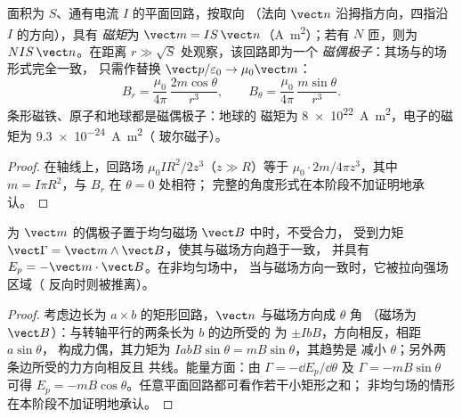 \begin{definition}[磁矩]\label{def:b1:magnetostatics:moment}
面积为 $S$、通有电流 $I$ 的平面回路，按取向
（法向 $\vect n$ 沿拇指方向，四指沿 $I$ 的方向），具有
\emph{磁矩}为 $\vect m = IS\,\vect n$（\unit{A.m^2}）；若有 $N$
匝，则为 $NIS\,\vect n$。在距离 $r \gg \sqrt S$ 处观察，该回路即为一个
\emph{磁偶极子}：其场与的场形式完全一致，
只需作替换 $\vect p/\varepsilon_0 \to \mu_0\vect m$：
\[
B_r = \frac{\mu_0}{4\pi}\,\frac{2m\cos\theta}{r^3}, \qquad
B_\theta = \frac{\mu_0}{4\pi}\,\frac{m\sin\theta}{r^3} .
\]
条形磁铁、原子和地球都是磁偶极子：地球的
磁矩为 \qty{8e22}{A.m^2}，电子的磁矩为 \qty{9.3e-24}{A.m^2}（
玻尔磁子）。
\end{definition}

\begin{proof}
在轴线上，回路场 $\mu_0IR^2/2z^3$（$z \gg R$）等于
$\mu_0 \cdot 2m/4\pi z^3$，其中 $m = I\pi R^2$，与 $B_r$ 在 $\theta = 0$ 处相符；
完整的角度形式在本阶段不加证明地承认。
\end{proof}

\begin{theorem}[场中的偶极子]\label{thm:b1:magnetostatics:dipoleinfield}
为 $\vect m$ 的偶极子置于均匀磁场 $\vect B$ 中时，不受合力，
受到力矩 $\vect\Gamma = \vect m\wedge\vect B$，使其与磁场方向趋于一致，
并具有 $E_p = -\vect m\cdot\vect B$。在非均匀场中，
当与磁场方向一致时，它被拉向强场区域（
反向时则被推离）。
\end{theorem}

\begin{proof}
考虑边长为 $a \times b$ 的矩形回路，$\vect n$ 与磁场方向成 $\theta$ 角
（磁场为 $\vect B$）：与转轴平行的两条长为 $b$ 的边所受的
为 $\pm IbB$，方向相反，相距 $a\sin\theta$，
构成力偶，其力矩为 $IabB\sin\theta = mB\sin\theta$，其趋势是
减小 $\theta$；另外两条边所受的力方向相反且
共线。能量方面：由 $\Gamma = -\dd E_p/\dd\theta$ 及 $\Gamma = -mB\sin\theta$
可得 $E_p = -mB\cos\theta$。任意平面回路都可看作若干小矩形之和；
非均匀场的情形在本阶段不加证明地承认。
\end{proof}

